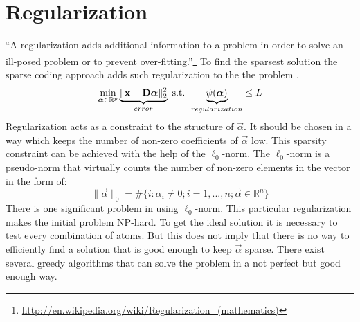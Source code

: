 \section{Regularization}
``A regularization adds additional information to a problem in order to solve an
ill-posed problem or to prevent over-fitting.''\footnote{\url{
http://en.wikipedia.org/wiki/Regularization_(mathematics)}}
To find the sparsest solution the sparse coding approach adds such
regularization to the the problem . 
\begin{equation}
\min_{\boldsymbol{\mathrm{\alpha}}\in\mathbb{R}^{p}}
\underbrace{\lVert \boldsymbol{\mathrm{x}} -
\boldsymbol{\mathrm{D}}\boldsymbol{\mathrm{\alpha}}\rVert^{2}_{2}}_{error} \text{ s.t. }
\underbrace{\psi(\boldsymbol{\mathrm{\alpha}})}_{regularization}\leq L \label{eq:problem2}
\end{equation}
Regularization acts as a constraint to the structure of $\vec{\alpha}$. It
should be chosen in a way which keeps the number of non-zero coefficients of
$\vec{\alpha}$ low. 
This sparsity constraint can be achieved with the help of
the $\ell_0$-norm. The $\ell_0$-norm is a pseudo-norm that virtually counts the
number of non-zero elements in the vector in the form of:
\begin{equation*}
\lVert \vec{\alpha} \rVert_{0} = \#\{i:\alpha_i \neq 
0; i=1,...,n; \vec{\alpha}\in\mathbb{R}^n\} 
\end{equation*}
There is one significant problem in using $\ell_0$-norm. This particular
regularization makes the initial problem  NP-hard. To get
the ideal solution it is necessary to test every combination of atoms. But this
does not imply that there is no way to efficiently find a solution that is good
enough to keep $\vec{\alpha}$ sparse. There exist several greedy algorithms that
can solve the problem in a not perfect but good enough way. 

